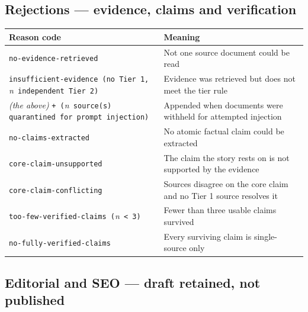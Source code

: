 \documentclass[11pt,a4paper]{article}
\newcommand{\brk}{\hyphenpenalty=0\exhyphenpenalty=0\relax}
\newcommand{\code}[1]{\texttt{\small\brk #1}}
\begin{document}
\subsection{Rejections --- evidence, claims and verification}

\begin{center}
\footnotesize
\begin{tabularx}{\textwidth}{@{}>{\RaggedRight}p{5.6cm} >{\RaggedRight}X@{}}
\toprule
\textbf{Reason code} & \textbf{Meaning} \\
\midrule
\code{no-evidence-retrieved} & Not one source document could be read \\
\code{insufficient-evidence (no Tier 1, }\textit{n}\code{ independent Tier 2)} & Evidence was retrieved but does not meet the tier rule \\
\textit{(the above)} \code{+ (}\textit{n}\code{ source(s) quarantined for prompt injection)} & Appended when documents were withheld for attempted injection \\
\code{no-claims-extracted} & No atomic factual claim could be extracted \\
\code{core-claim-unsupported} & The claim the story rests on is not supported by the evidence \\
\code{core-claim-conflicting} & Sources disagree on the core claim and no Tier 1 source resolves it \\
\code{too-few-verified-claims (}\textit{n}\code{ < 3)} & Fewer than three usable claims survived \\
\code{no-fully-}\allowbreak\code{verified-claims} & Every surviving claim is single-source only \\
\bottomrule
\end{tabularx}
\end{center}

\subsection{Editorial and SEO --- draft retained, not published}
\end{document}
